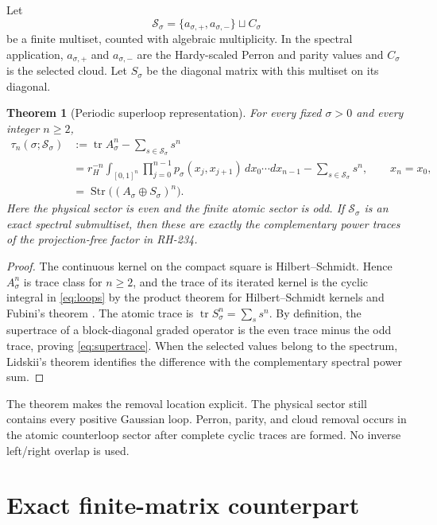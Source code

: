 \documentclass[11pt]{article}
\newtheorem{theorem}{Theorem}[section]
\theoremstyle{remark}
\newcommand{\Tr}{\operatorname{tr}}
\newcommand{\Str}{\operatorname{Str}}
\begin{document}
Let
\[
 \mathcal S_\sigma=\{a_{\sigma,+},a_{\sigma,-}\}\sqcup C_\sigma
\]
be a finite multiset, counted with algebraic multiplicity.  In the spectral
application, $a_{\sigma,+}$ and $a_{\sigma,-}$ are the Hardy-scaled Perron
and parity values and $C_\sigma$ is the selected cloud.  Let $S_\sigma$ be
the diagonal matrix with this multiset on its diagonal.

\begin{theorem}[Periodic superloop representation]\label{thm:superloop}
For every fixed $\sigma>0$ and every integer $n\ge2$,
\begin{align}
 \tau_n(\sigma;\mathcal S_\sigma)
 &:={\Tr}A_\sigma^n-\sum_{s\in\mathcal S_\sigma}s^n
 \label{eq:tau}\\
 &=r_H^{-n}\int_{[0,1]^n}
   \prod_{j=0}^{n-1}p_\sigma(x_j,x_{j+1})\,
   dx_0\cdots dx_{n-1}
   -\sum_{s\in\mathcal S_\sigma}s^n,
 \qquad x_n=x_0,\label{eq:loops}\\
 &=\Str\bigl((A_\sigma\oplus S_\sigma)^n\bigr).\label{eq:supertrace}
\end{align}
Here the physical sector is even and the finite atomic sector is odd.  If
$\mathcal S_\sigma$ is an exact spectral submultiset, then these are exactly
the complementary power traces of the projection-free factor in RH-234.
\end{theorem}

\begin{proof}
The continuous kernel on the compact square is Hilbert--Schmidt.  Hence
$A_\sigma^n$ is trace class for $n\ge2$, and the trace of its iterated kernel
is the cyclic integral in \eqref{eq:loops} by the product theorem for
Hilbert--Schmidt kernels and Fubini's theorem \citep{Simon2005}.  The atomic
trace is $\Tr S_\sigma^n=\sum_s s^n$.  By definition, the supertrace of a
block-diagonal graded operator is the even trace minus the odd trace, proving
\eqref{eq:supertrace}.  When the selected values belong to the spectrum,
Lidskii's theorem identifies the difference with the complementary spectral
power sum.
\end{proof}

The theorem makes the removal location explicit.  The physical sector still
contains every positive Gaussian loop.  Perron, parity, and cloud removal
occurs in the atomic counterloop sector after complete cyclic traces are
formed.  No inverse left/right overlap is used.

\section{Exact finite-matrix counterpart}
\end{document}
